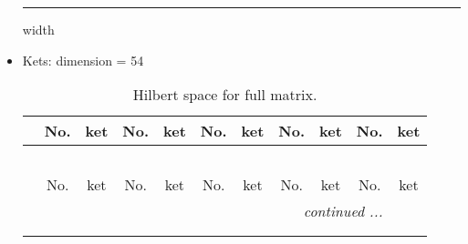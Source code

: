 \documentclass[fleqn,10pt,landscape]{article}
\begin{document}
\begin{itemize}
 \hfil \hrule height 1mm width \textwidth \hfil

\item Kets: dimension = 54
\begin{center}
\renewcommand{\arraystretch}{1.3}
\begin{longtable}{c|cc|cc|cc|cc|cc}
\caption{Hilbert space for full matrix.}
 \\
 \hline \hline
 & No. & ket & No. & ket & No. & ket & No. & ket & No. & ket \\ \hline \endfirsthead

\multicolumn{10}{l}{\tablename\ \thetable{}} \\
 \hline \hline
 & No. & ket & No. & ket & No. & ket & No. & ket & No. & ket \\ \hline \endhead

 \hline \hline
\multicolumn{10}{r}{\footnotesize\it continued ...} \\ \endfoot

 \hline \hline
\multicolumn{10}{r}{} \\ \endlastfoot


\end{longtable}
\end{center}
\end{itemize}
\end{document}
